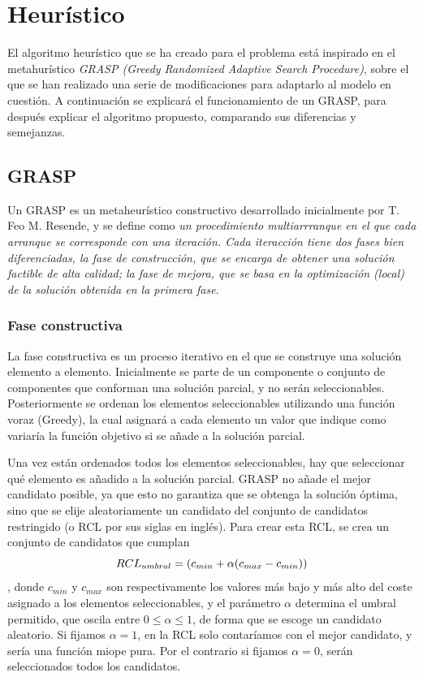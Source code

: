 \chapter{Heurístico}
\label{heurístico}
El algoritmo heurístico que se ha creado para el problema está inspirado en el metahurístico \textit{GRASP (Greedy Randomized Adaptive Search Procedure)}, sobre el que se han realizado una serie de modificaciones para adaptarlo al modelo en cuestión. A continuación se explicará el funcionamiento de un GRASP, para después explicar el algoritmo propuesto, comparando sus diferencias y semejanzas.

\section{GRASP}
Un GRASP es un metaheurístico constructivo desarrollado inicialmente por T. Feo   M. Resende, y se define como \cite{metaheurísticas} \textit{un procedimiento multiarrranque en el que cada arranque se corresponde con una iteración. Cada iteracción tiene dos fases bien diferenciadas, la fase de construcción, que se encarga de obtener una solución factible de alta calidad; la fase de mejora, que se basa en la optimización (local) de la solución obtenida en la primera fase.}

\subsection{Fase constructiva}
La fase constructiva es un proceso iterativo en el que se construye una solución elemento a elemento. Inicialmente se parte de un componente o conjunto de componentes que conforman una solución parcial, y no serán seleccionables. Posteriormente se ordenan los elementos seleccionables utilizando una función voraz (Greedy), la cual asignará a cada elemento un valor que indique como variaría la función objetivo si se añade a la solución parcial.

Una vez están ordenados todos los elementos seleccionables, hay que seleccionar qué elemento es añadido a la solución parcial. GRASP no añade el mejor candidato posible, ya que esto no garantiza que se obtenga la solución óptima, sino que se elije aleatoriamente un candidato del conjunto de candidatos restringido (o RCL por sus siglas en inglés). Para crear esta RCL, se crea un conjunto de candidatos que cumplan
\begin{equation}\\
{RCL}_{umbral} = (c_{min}+\alpha(c_{max} - c_{min} ))
\end{equation}
, donde $c_{min}$ y $c_{max}$ son respectivamente los valores más bajo y más alto del coste asignado a los elementos seleccionables, y el parámetro $\alpha$ determina el umbral permitido, que oscila entre $0\leq \alpha \leq1$, de forma que se escoge un candidato aleatorio. Si fijamos $\alpha=1$, en la RCL solo contaríamos con el mejor candidato, y sería una función miope pura. Por el contrario si fijamos $\alpha=0$, serán seleccionados todos los candidatos.


